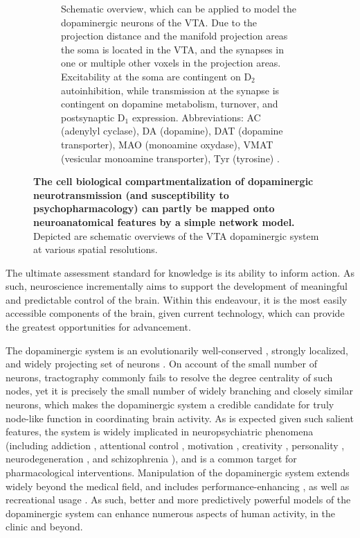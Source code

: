 \begin{sansmath}
\begin{figure}[h!]
\begin{subfigure}{.985\textwidth}
		\caption{
			Schematic overview, which can be applied to model the dopaminergic neurons of the VTA.
			Due to the projection distance and the manifold projection areas the soma is located in the VTA, and the synapses in one or multiple other voxels in the projection areas.
			Excitability at the soma are contingent on $\mathrm{D_2}$ autoinhibition, while transmission at the synapse is contingent on dopamine metabolism, turnover, and postsynaptic $\mathrm{D_1}$ expression.
			Abbreviations: AC (adenylyl cyclase), DA (dopamine), DAT (dopamine transporter), MAO (monoamine oxydase), VMAT (vesicular monoamine transporter), Tyr (tyrosine) \cite{Torres2003}.
			}
		\label{fig:nm}
	\end{subfigure}
	\caption{
		\textbf{The cell biological compartmentalization of dopaminergic neurotransmission (and susceptibility to psychopharmacology) can partly be mapped onto neuroanatomical features by a simple network model.}
		Depicted are schematic overviews of the VTA dopaminergic system at various spatial resolutions.
		}
	\label{fig:m}
\end{figure}
\end{sansmath}

The ultimate assessment standard for knowledge is its ability to inform action.
As such, neuroscience incrementally aims to support the development of meaningful and predictable control of the brain.
Within this endeavour, it is the most easily accessible components of the brain, given current technology, which can provide the greatest opportunities for advancement.

The dopaminergic system is an evolutionarily well-conserved \cite{Yamamoto2011}, strongly localized, and widely projecting set of neurons \cite{Aransay2015,Fields2007,Ikemoto2007,Hnasko2012}.
On account of the small number of neurons, tractography commonly fails to resolve the degree centrality of such nodes, yet it is precisely the small number of widely branching and closely similar neurons, which makes the dopaminergic system a credible candidate for truly node-like function in coordinating brain activity.
As is expected given such salient features, the system is widely implicated in neuropsychiatric phenomena (including
addiction \cite{DiChiara1988,DiChiara1999},
attentional control \cite{Nieoullon2002},
motivation \cite{Salamone1994},
creativity \cite{Chermahini2010},
personality \cite{Depue1999},
neurodegeneration \cite{Masliah2000},
and schizophrenia \cite{Howes2009}),
and is a common target for pharmacological interventions.
Manipulation of the dopaminergic system extends widely beyond the medical field, and includes performance-enhancing \cite{Mehta2000,Turner2003}, as well as recreational usage \cite{DiChiara1988}.
As such, better and more predictively powerful models of the dopaminergic system can enhance numerous aspects of human activity, in the clinic and beyond.

